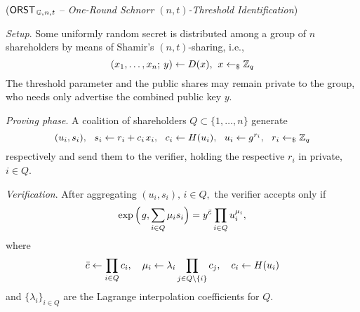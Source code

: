 \documentclass{iacrtrans}
\begin{document}
\begin{protocol}\label{orst_protocol}
($
\mathsf{ORST}
	_{\hspace{1pt}\mathbb{G},\hspace{0.5pt} n,\hspace{0.5pt} t}
$
-- \textit{One-Round Schnorr $(n, t)$-Threshold Identification})
\enumerate[label=$\circ$, leftmargin=17pt]
\vspace{2pt}
\item \textit{Setup}. Some uniformly random secret is
distributed among a group of $n$ shareholders
by means of Shamir's $(n, t)$-sharing, i.e.,
\vspace{5pt}
\begin{equation*}\label{orst_sharing}
(x_1, \dots, x_n;\hspace{2pt} y) \leftarrow D(x),
\hspace{4pt} x \leftarrow_\$ \mathbb{Z}_q
\vspace{5pt}
\end{equation*}
The threshold parameter and the public shares may remain private to the group,
who needs only advertise the combined public key $y$.
\vspace{5pt}
\item \textit{Proving phase}. A coalition of shareholders
$Q \subset \{1, \dots, n\}$ generate
\vspace{5pt}
\begin{equation*}
(u_i, s_i),
\ \ s_i \leftarrow r_i + c_i\hspace{1pt} x_i,
\ \ c_i \leftarrow H(u_i),
\ \ u_i \leftarrow g ^ {r_i},
\ \ r_i \leftarrow_\$ \mathbb{Z}_q
\vspace{5pt}
\end{equation*}
respectively and send them to the verifier,
holding the respective $r_i$ in private, $i \in Q$.
\vspace{5pt}
\item \textit{Verification}.
After aggregating $(u_i, s_i),\hspace{2pt} i \in Q,$
the verifier accepts only if
\vspace{6pt}
\begin{equation}\label{orst_verification_0}
\exp\Big(\hspace{1pt}g, \sum_{i \in Q} \mu_i s_i\Big) =
y^{\bar{c}} \prod_{i \in Q} u_i ^ {\mu_i},
\vspace{-3pt}
\end{equation}
where
\vspace{2pt}
\begin{equation}\label{orst_aliases}
\bar{c} \leftarrow \prod_{i \in Q} c_i,
\ \ \  \mu_i \leftarrow \lambda_i \prod_{j \in Q \setminus \{i\}} c_j,
\ \ \  c_i \leftarrow H(u_i)
\vspace{8pt}
\end{equation}
and $\{\lambda_i\}_{i \in Q }$ are the
Lagrange interpolation coefficients for $Q$.
\vspace{5pt}
\end{protocol}
\end{document}
